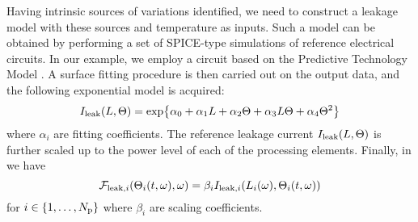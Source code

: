 Having intrinsic sources of variations identified, we need to construct a leakage model with these sources and temperature as inputs. Such a model can be obtained by performing a set of SPICE-type simulations of reference electrical circuits. In our example, we employ a circuit based on the Predictive Technology Model \cite{ptm}. A surface fitting procedure is then carried out on the output data, and the following exponential model is acquired:
\begin{equation} \elabel{leakage-current}
  I_\leak(\Leff, \T) = \text{exp} \big\{ \alpha_0 + \alpha_1 \Leff + \alpha_2 \T + \alpha_3 \Leff \T + \alpha_4 \T^2 \big\}
\end{equation}
where $\alpha_i$ are fitting coefficients. The reference leakage current $I_{\text{leak}}(L, \Theta)$ is further scaled up to the power level of each of the processing elements. Finally, in  we have
\[
  \mathcal{F}_{\text{leak}, i}(\Theta_i(t, \omega), \omega) = \beta_i I_{\text{leak}, i}(L_i(\omega), \Theta_i(t, \omega))
\]
for $i \in \{ 1, \dotsc, {N_\text{p}} \}$ where $\beta_i$ are scaling coefficients.
